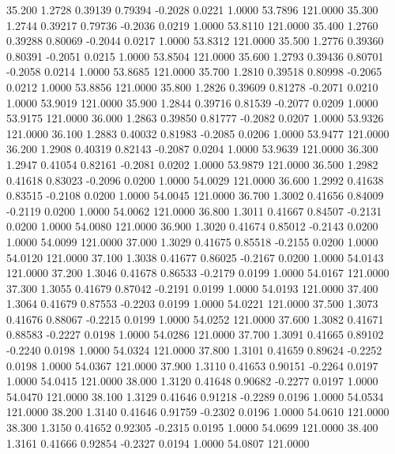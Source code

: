   35.200   1.2728   0.39139   0.79394  -0.2028   0.0221   1.0000  53.7896 121.0000
  35.300   1.2744   0.39217   0.79736  -0.2036   0.0219   1.0000  53.8110 121.0000
  35.400   1.2760   0.39288   0.80069  -0.2044   0.0217   1.0000  53.8312 121.0000
  35.500   1.2776   0.39360   0.80391  -0.2051   0.0215   1.0000  53.8504 121.0000
  35.600   1.2793   0.39436   0.80701  -0.2058   0.0214   1.0000  53.8685 121.0000
  35.700   1.2810   0.39518   0.80998  -0.2065   0.0212   1.0000  53.8856 121.0000
  35.800   1.2826   0.39609   0.81278  -0.2071   0.0210   1.0000  53.9019 121.0000
  35.900   1.2844   0.39716   0.81539  -0.2077   0.0209   1.0000  53.9175 121.0000
  36.000   1.2863   0.39850   0.81777  -0.2082   0.0207   1.0000  53.9326 121.0000
  36.100   1.2883   0.40032   0.81983  -0.2085   0.0206   1.0000  53.9477 121.0000
  36.200   1.2908   0.40319   0.82143  -0.2087   0.0204   1.0000  53.9639 121.0000
  36.300   1.2947   0.41054   0.82161  -0.2081   0.0202   1.0000  53.9879 121.0000
  36.500   1.2982   0.41618   0.83023  -0.2096   0.0200   1.0000  54.0029 121.0000
  36.600   1.2992   0.41638   0.83515  -0.2108   0.0200   1.0000  54.0045 121.0000
  36.700   1.3002   0.41656   0.84009  -0.2119   0.0200   1.0000  54.0062 121.0000
  36.800   1.3011   0.41667   0.84507  -0.2131   0.0200   1.0000  54.0080 121.0000
  36.900   1.3020   0.41674   0.85012  -0.2143   0.0200   1.0000  54.0099 121.0000
  37.000   1.3029   0.41675   0.85518  -0.2155   0.0200   1.0000  54.0120 121.0000
  37.100   1.3038   0.41677   0.86025  -0.2167   0.0200   1.0000  54.0143 121.0000
  37.200   1.3046   0.41678   0.86533  -0.2179   0.0199   1.0000  54.0167 121.0000
  37.300   1.3055   0.41679   0.87042  -0.2191   0.0199   1.0000  54.0193 121.0000
  37.400   1.3064   0.41679   0.87553  -0.2203   0.0199   1.0000  54.0221 121.0000
  37.500   1.3073   0.41676   0.88067  -0.2215   0.0199   1.0000  54.0252 121.0000
  37.600   1.3082   0.41671   0.88583  -0.2227   0.0198   1.0000  54.0286 121.0000
  37.700   1.3091   0.41665   0.89102  -0.2240   0.0198   1.0000  54.0324 121.0000
  37.800   1.3101   0.41659   0.89624  -0.2252   0.0198   1.0000  54.0367 121.0000
  37.900   1.3110   0.41653   0.90151  -0.2264   0.0197   1.0000  54.0415 121.0000
  38.000   1.3120   0.41648   0.90682  -0.2277   0.0197   1.0000  54.0470 121.0000
  38.100   1.3129   0.41646   0.91218  -0.2289   0.0196   1.0000  54.0534 121.0000
  38.200   1.3140   0.41646   0.91759  -0.2302   0.0196   1.0000  54.0610 121.0000
  38.300   1.3150   0.41652   0.92305  -0.2315   0.0195   1.0000  54.0699 121.0000
  38.400   1.3161   0.41666   0.92854  -0.2327   0.0194   1.0000  54.0807 121.0000
